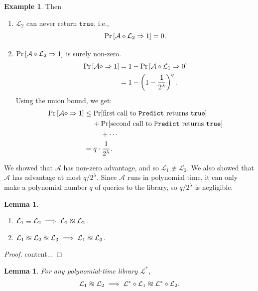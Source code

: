 \documentclass[12pt,openany]{book}
\newtheorem{lemma}[theorem]{Lemma}
\theoremstyle{definition}
\newtheorem{example}{Example}[chapter]
\newcommand{\ie}{\textnormal{i.e.}}
\newcommand{\library}{\mathcal{L}}
\newcommand{\tab}{\hspace{12pt}}
\newcommand{\adversary}{\mathcal{A}}
\newcommand{\linking}{\diamond}
\newcommand{\true}{\texttt{true}}
\newcommand*{\indist}{%
	\mathrel{\vcenter{\offinterlineskip
			\hbox{$\sim$}\vskip-.35ex\hbox{$\sim$}\vskip-.35ex\hbox{$\sim$}}}}
\newcommand{\outputs}{\Rightarrow}
\begin{document}
\begin{example}
		Then \begin{enumerate}[(1)]
			\item $\library_2$ can never return $\true$, \ie, \[
			\Pr\sbr{\adversary\linking\library_2\outputs 1}=0.
			\]
			\item $\Pr\sbr{\adversary\linking\library_{2}\outputs 1}$ is surely non-zero.
			\begin{align*}
				\Pr\sbr{\adversary\linking\outputs 1}&=1-\Pr\left[\adversary\linking\library_{1}\outputs 0\right]\\
				&=1-\del{1-\frac{1}{2^\lambda}}^q.
			\end{align*}
			Using the union bound, we get: \begin{align*}
				\Pr\sbr{\adversary\linking\outputs 1}&\leq\Pr[\text{first call to \texttt{Predict} returns $\true$}]\\
				&\tab+\Pr[\text{second call to \texttt{Predict} returns $\true$}]\\
				&\tab\tab+\cdots\\
				&=q\cdot\frac{1}{2^\lambda}.
			\end{align*}
		\end{enumerate}
		We showed that $\adversary$ has non-zero advantage, and so $\library_{1}\nequiv\library_{2}$. We also showed that $\adversary$ has advantage at most $q/2^\lambda$. Since $\adversary$ runs in polynomial time, it can only make a polynomial number $q$ of queries to the library, so $q/2^\lambda$ is negligible.
	\end{example}
	\vspace{20pt}
	\begin{tcolorbox}[colframe=lemcolor,title={\color{white}\bf }]
		\begin{lemma}
			\ \begin{enumerate}[(1)]
				\item $\library_{1}\equiv\library_{2}\implies\library_{1}\indist\library_{2}$.
				\item $\library_{1}\indist\library_{2}\indist\library_{3}\implies\library_{1}\indist\library_{3}$.
			\end{enumerate}
		\end{lemma}
	\end{tcolorbox}
	\begin{proof}
		content...
	\end{proof}
	\begin{tcolorbox}[colframe=lemcolor,title={\color{white}\bf }]
		\begin{lemma}
			For any polynomial-time library $\library^*$, \[
			\library_{1}\indist\library_{2}\implies\library^*\linking\library_{1}\indist\library^*\linking\library_2.
			\]
		\end{lemma}
	\end{tcolorbox}
\end{document}
